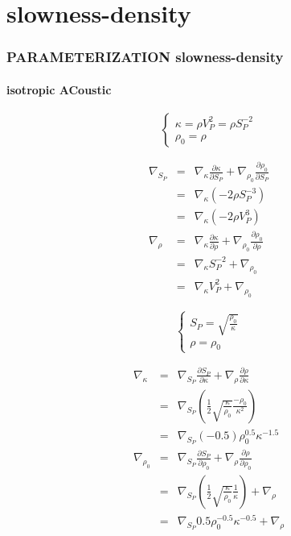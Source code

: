 \documentclass[9pt]{beamer}
\newcommand{\partderi}[2]{\frac{\partial#1}{\partial#2}}
\begin{document}
\section{slowness-density}

\begin{frame}\frametitle{PARAMETERIZATION slowness-density}
\framesubtitle{isotropic ACoustic}

  \begin{center}
  \end{center}
  
  \begin{minipage}{0.5\linewidth}
    \[\left\{ \begin{array}{l}
      \kappa = \rho V_P^2 = \rho S_P^{-2} \\
      \rho_0 = \rho 
    \end{array} \right.\]
    
    \begin{eqnarray}
      \nabla_{S_P} &=& \nabla_{\kappa} \partderi{\kappa}{S_P} + \nabla_{\rho_0} \partderi{\rho_0}{S_P} \nonumber\\
                   &=& \nabla_{\kappa} (-2\rho S_P^{-3})  \nonumber\\
                   &=& \nabla_{\kappa} (-2\rho V_P^3)  \nonumber\\
      \nabla_{\rho} &=& \nabla_{\kappa} \partderi{\kappa}{\rho} + \nabla_{\rho_0} \partderi{\rho_0}{\rho} \nonumber\\
		    &=& \nabla_{\kappa} S_P^{-2} + \nabla_{\rho_0} \nonumber\\
		    &=& \nabla_{\kappa} V_P^2 + \nabla_{\rho_0} \nonumber
    \end{eqnarray}

  \end{minipage} \vline
  \begin{minipage}{0.45\linewidth}
    \[\left\{ \begin{array}{l}
      S_P  = \sqrt{\frac{\rho_0}{\kappa}} \\
      \rho = \rho_0
    \end{array} \right.\]
    
    \begin{eqnarray}
      \nabla_{\kappa} &=& \nabla_{S_P} \partderi{S_P}{\kappa} + \nabla_{\rho} \partderi{\rho}{\kappa} \nonumber\\
                      &=& \nabla_{S_P} \left(\frac{1}{2}\sqrt{\frac{\kappa}{\rho_0}}\frac{-\rho_0}{\kappa^2}\right) \nonumber\\
                      &=& \nabla_{S_P} (-0.5)\rho_0^{0.5}\kappa^{-1.5} \nonumber\\
      \nabla_{\rho_0} &=& \nabla_{S_P} \partderi{S_P}{\rho_0} + \nabla_{\rho} \partderi{\rho}{\rho_0} \nonumber\\
                      &=& \nabla_{S_P} \left(\frac{1}{2}\sqrt{\frac{\kappa}{\rho_0}}\frac{1}{\kappa}\right) + \nabla_{\rho} \nonumber\\
                      &=& \nabla_{S_P} 0.5\rho_0^{-0.5}\kappa^{-0.5} + \nabla_{\rho} \nonumber
    \end{eqnarray}
  \end{minipage}


\end{frame}
\end{document}
